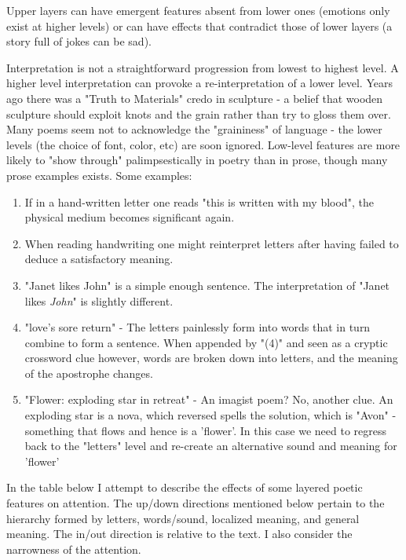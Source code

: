 \documentclass[11pt]{article}
\begin{document}
Upper layers can have emergent features absent from lower ones (emotions
  only exist at higher levels) or can have effects that contradict those of
  lower layers (a story full of jokes can be sad).

Interpretation is not a straightforward progression from lowest to highest level. A higher level interpretation can provoke a re-interpretation
of a lower level. Years ago there was a "Truth to Materials" credo in
sculpture - a belief that wooden sculpture should exploit knots and the
grain rather than try to gloss them over. Many poems seem not to
acknowledge the "graininess" of language - the lower levels (the choice of font, color, etc) are soon ignored. Low-level features are more likely to "show through"
palimpsestically in poetry than in prose, though many prose examples exists. Some examples:

\begin{enumerate}
\item If in a hand-written letter one reads
"this is written with my blood", the physical medium becomes significant again.

\item When reading handwriting one might reinterpret letters after having failed
to deduce a satisfactory meaning.
\item 
  "Janet likes John" is a simple enough sentence. The interpretation of  "Janet likes \textit{John}" is slightly different.
\item "love's sore return" - The letters painlessly form into words that in turn combine to form a
sentence. When appended by "(4)" and seen as a cryptic crossword clue
however, words are broken down into letters, and the meaning of the apostrophe changes.
\item 
  "Flower: exploding star in retreat" - An imagist poem? No, another clue.
An exploding star is a
nova, which reversed spells the solution, which is "Avon" - something that flows and 
hence is a 'flower'. In this case we need to regress back to the 
"letters" level and re-create an alternative sound and meaning for 'flower'
\end{enumerate}

 In the table
below I attempt to describe the effects of some layered poetic features on
attention.
The up/down directions mentioned below pertain to the hierarchy formed by
letters, words/sound, localized meaning, and general meaning. The in/out
direction is relative to the text. I also consider the narrowness of the attention.
\end{document}
